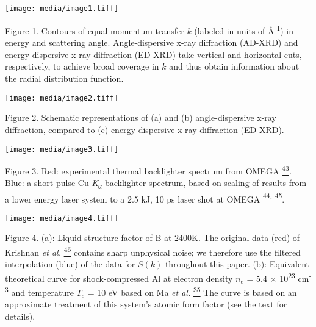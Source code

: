 \subsection{}\label{section}

\subsection{}\label{section-1}

\subsection{}\label{section-2}

\subsection{}\label{section-3}

\texttt{[image: media/image1.tiff]}

Figure 1. Contours of equal momentum transfer \(k\) (labeled in units of
Å\textsuperscript{-1}) in energy and scattering angle. Angle-dispersive
x-ray diffraction (AD-XRD) and energy-dispersive x-ray diffraction
(ED-XRD) take vertical and horizontal cuts, respectively, to achieve
broad coverage in \(k\) and thus obtain information about the radial
distribution function.

\texttt{[image: media/image2.tiff]}

Figure 2. Schematic representations of (a) and (b) angle-dispersive
x-ray diffraction, compared to (c) energy-dispersive x-ray diffraction
(ED-XRD).

\texttt{[image: media/image3.tiff]}

Figure 3. Red: experimental thermal
backlighter spectrum from OMEGA
\hyperref[b.-yaakobi-2012-private-communication.]{\textsuperscript{43}}\emph{.}
Blue: a short-pulse Cu \emph{K\textsubscript{α}} backlighter spectrum,
based on scaling of results from a lower energy laser system to a 2.5
kJ, 10 ps laser shot at OMEGA
\hyperref[p.-m.-nilson-2012-private-communication.]{\textsuperscript{44}}\textsuperscript{,}
\hyperref[k.-u.-akli-et-al.-physics-of-plasmas-14-023102-2007.]{\textsuperscript{45}}\hyperref[b.-a.-mattern-g.-t.-seidler-j.-j.-kas-j.-i.-pacold-and-j.-j.-rehr-physical-review-b-85-115135-2012.]{}.

\texttt{[image: media/image4.tiff]}

Figure 4. (a): Liquid structure factor of B at 2400K. The original data
(red) of Krishnan \emph{et al.}
\hyperref[s.-krishnan-s.-ansell-j.-j.-felten-k.-j.-volin-and-d.-l.-price-physical-review-letters-81-586-1998.]{\textsuperscript{46}}
contains sharp unphysical noise; we therefore use the filtered
interpolation (blue) of the data for \(S(k)\) throughout this paper.
(b): Equivalent theoretical curve for shock-compressed Al at electron
density \(n_{e}\) = 5.4 × 10\textsuperscript{23} cm\textsuperscript{-3}
and temperature \(T_{e}\) = 10 eV based on Ma \emph{et al.}
\hyperref[t.-ma-et-al.-physical-review-letters-110-065001-2013.]{\textsuperscript{35}}
The curve is based on an approximate treatment of this system's atomic
form factor (see the text for details).

